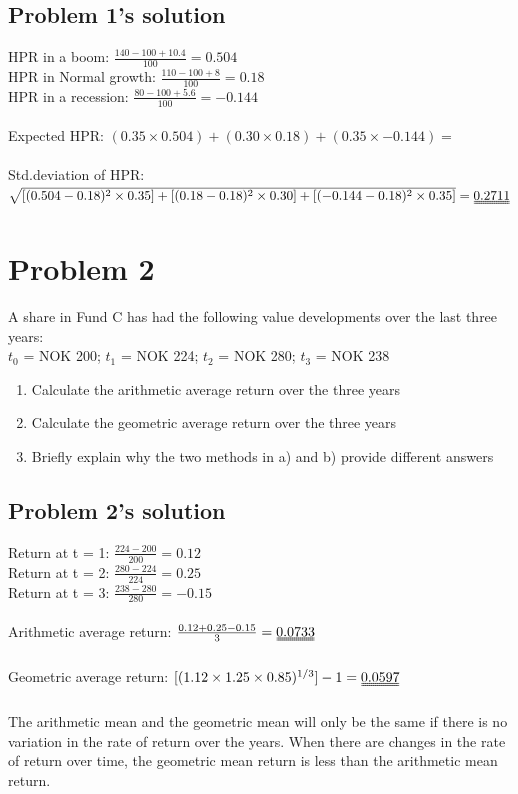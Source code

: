 \documentclass[10]{article}
\begin{document}
\color{blue}
\subsection*{Problem 1's solution}
HPR in a boom: $\frac{140-100+10.4}{100} = 0.504$\\
HPR in Normal growth: $\frac{110-100+8}{100} = 0.18$\\
HPR in a recession: $\frac{80-100+5.6}{100} = -0.144$\\
\\
Expected HPR: $(0.35 \times 0.504)+(0.30 \times 0.18)+(0.35 \times -0.144) =$ \\
\\
Std.deviation of HPR: $\sqrt{[(0.504 - 0.18)^2\times0.35]+[(0.18-0.18)^2\times0.30]+[(-0.144 - 0.18)^2\times0.35]} = \uuline{0.2711}$ 



\color{black}
\section*{Problem 2}
A share in Fund C has had the following value developments over the last three years:\\
$t_0$ = NOK 200; $t_1$ = NOK 224; $t_2$ = NOK 280; $t_3$ = NOK 238
\begin{enumerate}
    \item[a)] Calculate the arithmetic average return over the three years
    \item[b)] Calculate the geometric average return over the three years
    \item[c)] Briefly explain why the two methods in a) and b) provide different answers
\end{enumerate}



\color{blue}
\subsection*{Problem 2's solution}
Return at t = 1: $\frac{224-200}{200} = 0.12$ \\
Return at t = 2: $\frac{280 - 224}{224} = 0.25$ \\
Return at t = 3: $\frac{238 - 280}{280}= -0.15$ \\
\\
Arithmetic average return: $\frac{0.12 + 0.25 - 0.15}{3} = \uuline{0.0733}$\\
\\
Geometric average return: $[(1.12 \times 1.25 \times 0.85)^{1/3}] -1 = \uuline{0.0597}$\\
\\
The arithmetic mean and the geometric mean will only be the same if there is no variation in the rate of return over the years. When there are changes in the rate of return over time, the geometric mean return is less than the arithmetic mean return. 
\end{document}
